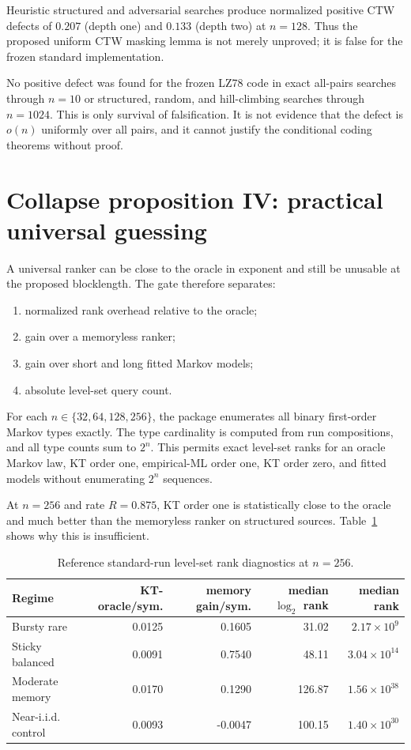 \documentclass[11pt]{article}
\begin{document}
Heuristic structured and adversarial searches produce normalized positive CTW defects of $0.207$ (depth one) and $0.133$ (depth two) at $n=128$.  Thus the proposed uniform CTW masking lemma is not merely unproved; it is false for the frozen standard implementation.

No positive defect was found for the frozen LZ78 code in exact all-pairs searches through $n=10$ or structured, random, and hill-climbing searches through $n=1024$.  This is only survival of falsification.  It is not evidence that the defect is $o(n)$ uniformly over all pairs, and it cannot justify the conditional coding theorems without proof.

\section{Collapse proposition IV: practical universal guessing}

A universal ranker can be close to the oracle in exponent and still be unusable at the proposed blocklength.  The gate therefore separates:
\begin{enumerate}
  \item normalized rank overhead relative to the oracle;
  \item gain over a memoryless ranker;
  \item gain over short and long fitted Markov models;
  \item absolute level-set query count.
\end{enumerate}

For each $n\in\{32,64,128,256\}$, the package enumerates all binary first-order Markov types exactly.  The type cardinality is computed from run compositions, and all type counts sum to $2^n$.  This permits exact level-set ranks for an oracle Markov law, KT order one, empirical-ML order one, KT order zero, and fitted models without enumerating $2^n$ sequences.

At $n=256$ and rate $R=0.875$, KT order one is statistically close to the oracle and much better than the memoryless ranker on structured sources.  Table~\ref{tab:rank} shows why this is insufficient.

\begin{table}[H]
\centering
\caption{Reference standard-run level-set rank diagnostics at $n=256$.}
\label{tab:rank}
\small
\begin{tabular}{@{}lrrrr@{}}
\toprule
Regime & KT-oracle/sym. & memory gain/sym. & median $\log_2$ rank & median rank \\
\midrule
Bursty rare & 0.0125 & 0.1605 & 31.02 & $2.17\times10^9$ \\
Sticky balanced & 0.0091 & 0.7540 & 48.11 & $3.04\times10^{14}$ \\
Moderate memory & 0.0170 & 0.1290 & 126.87 & $1.56\times10^{38}$ \\
Near-i.i.d. control & 0.0093 & -0.0047 & 100.15 & $1.40\times10^{30}$ \\
\bottomrule
\end{tabular}
\end{table}
\end{document}
